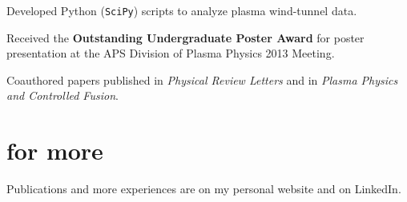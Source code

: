 \documentclass[]{friggeri-cv}
\begin{document}
\begin{entrylist}
{\begin{my-itemize}
      \item Developed Python (\texttt{SciPy}) scripts to analyze plasma wind-tunnel data.

      \item Received the \textbf{Outstanding Undergraduate Poster Award} for poster presentation at the APS Division of Plasma Physics 2013 Meeting.

      \item Coauthored papers published in \textit{Physical Review Letters} and in \textit{Plasma Physics and Controlled Fusion}.
      \end{my-itemize}
    }
%
\end{entrylist}

\section{for more}
Publications and more experiences are on my personal website and on LinkedIn.

\end{document}

